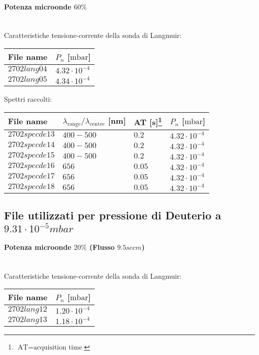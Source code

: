 \paragraph*{Potenza microonde $\text{60\%}$} ~\\
Caratteristiche tensione-corrente della sonda di Langmuir:
\begin{center}
\begin{tabular}{p{3cm}p{3cm}}
\toprule
File name	&$P_n$ [$\si{\milli\bar}$]\\
\midrule
$2702lang04$	&$4.32\cdot10^{-4}$\\
$2702lang05$	&$4.34\cdot10^{-4}$\\
\bottomrule
\end{tabular}
\end{center}

Spettri raccolti:
\begin{center}
\begin{tabular}{p{3cm}p{4cm}p{2cm}p{3cm}}
\toprule
File name	&$\lambda_\text{range}\text{/}\lambda_\text{centre}$ [nm] 	&AT [s]\footnote{$\text{AT}=\text{acquisition time}$} &$P_n$ [$\si{\milli\bar}$]\\
\midrule
$2702specde13$	&$400-500$	&$0.2$		&$4.32\cdot10^{-4}$\\
$2702specde14$	&$400-500$	&$0.2$		&$4.32\cdot10^{-4}$\\
$2702specde15$	&$400-500$	&$0.2$		&$4.32\cdot10^{-4}$\\
$2702specde16$	&$656$		&$0.05$		&$4.32\cdot10^{-4}$\\
$2702specde17$	&$656$		&$0.05$		&$4.32\cdot10^{-4}$\\
$2702specde18$	&$656$		&$0.05$		&$4.32\cdot10^{-4}$\\
\bottomrule
\end{tabular}
\end{center}



\subsection{File utilizzati per pressione di Deuterio a $9.31\cdot10^{-5}mbar$}

\paragraph*{Potenza microonde $\text{20\%}$ (Flusso $9.5sccm$) }~\\
Caratteristiche tensione-corrente della sonda di Langmuir:
\begin{center}
\begin{tabular}{p{3cm}p{3cm}}
\toprule
File name	&$P_{n}$ [$\si{\milli\bar}$]\\
\midrule
$2702lang12$	&$1.20\cdot10^{-4}$\\
$2702lang13$	&$1.18\cdot10^{-4}$\\
\bottomrule
\end{tabular}
\end{center}

